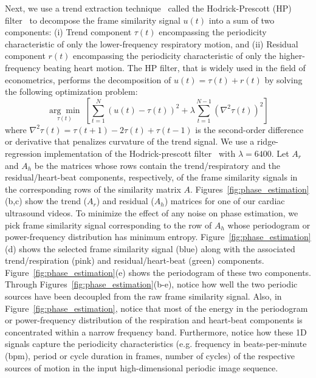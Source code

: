 \documentclass[runningheads,a4paper]{llncs}
\newcommand{\argmin}[1]{\underset{#1}{\operatorname{arg}\operatorname{min}}\;}
\begin{document}
	Next, we use a trend extraction technique~\cite{Alexandrov2012} called the Hodrick-Prescott (HP) filter~\cite{Hodrick1997} to decompose the frame similarity signal $u(t)$ into a sum of two components: (i) Trend component $\tau(t)$ encompassing the periodicity characteristic of only the lower-frequency respiratory motion, and (ii) Residual component $r(t)$ encompassing the periodicity characteristic of only the higher-frequency beating heart motion. The HP filter, that is widely used in the field of econometrics, performs the decomposition of $u(t) = \tau(t) + r(t)$ by solving the following optimization problem:
\begin{equation}	
\argmin{\tau(t)} \left[ \sum_{t=1}^{N}  \left(u(t) - \tau(t) \right)^2  + \lambda \sum_{t=1}^{N-1} \left( \nabla^2 \tau(t) \right)^2 \right] 
\end{equation}
where $\nabla^2\tau(t) = \tau(t+1) - 2 \tau(t) + \tau(t-1)$ is the second-order difference or derivative that penalizes curvature of the trend signal. We use a ridge-regression implementation of the Hodrick-prescott filter~\cite{Yamada2015} with $\lambda=6400$. Let $A_r$ and $A_h$ be the matrices whose rows contain the trend/respiratory and the residual/heart-beat components, respectively, of the frame similarity signals in the corresponding rows of the similarity matrix $A$. Figures~\ref{fig:phase_estimation}(b,c) show the trend ($A_r$) and residual ($A_h$) matrices for one of our cardiac ultrasound videos. To minimize the effect of any noise on phase estimation, we pick frame similarity signal corresponding to the row of $A_h$ whose periodogram or power-frequency distribution has minimum entropy. Figure~\ref{fig:phase_estimation}(d) shows the selected frame similarity signal (blue) along with the associated trend/respiration (pink) and residual/heart-beat (green) components. Figure~\ref{fig:phase_estimation}(e) shows the periodogram of these two components. Through Figures~\ref{fig:phase_estimation}(b-e), notice how well the two periodic sources have been decoupled from the raw frame similarity signal. Also, in Figure~\ref{fig:phase_estimation}, notice that most of the energy in the periodogram or power-frequency distribution of the respiration and heart-beat components is concentrated within a narrow frequency band. Furthermore, notice how these 1D signals capture the periodicity characteristics (e.g. frequency in beats-per-minute (bpm), period or cycle duration in frames, number of cycles) of the respective sources of motion in the input high-dimensional periodic image sequence.  
		
\end{document}
